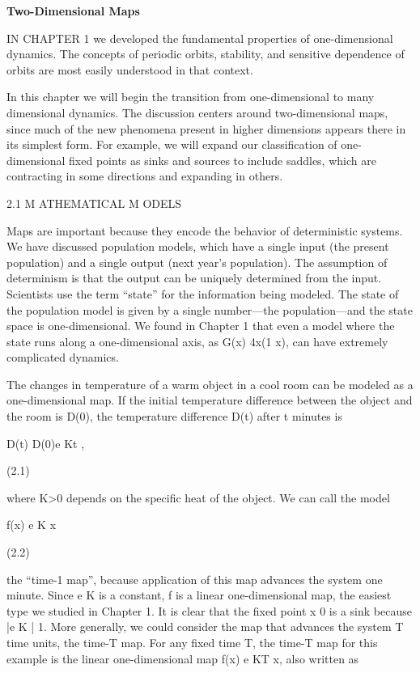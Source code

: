 \documentclass[12pt]{article}
\begin{document}
\textbf{Two-Dimensional Maps }

\hfill

IN CHAPTER 1 we developed the fundamental properties of one-dimensional dynamics. The concepts of periodic orbits, stability, and 
sensitive dependence of orbits are most easily understood in that context.

In this chapter we will begin the transition from one-dimensional to many dimensional dynamics. The discussion centers around 
two-dimensional maps, since much of the new phenomena present in higher dimensions appears there in its simplest form. For example, 
we will expand our classiﬁcation of one-dimensional ﬁxed points as sinks and sources to include saddles, which are contracting in 
some directions and expanding in others.


2.1 M ATHEMATICAL M ODELS

Maps are important because they encode the behavior of deterministic systems. We have discussed population models, which have a 
single input (the present population) and a single output (next year’s population). The assumption of determinism is that the output 
can be uniquely determined from the input. Scientists use the term “state” for the information being modeled. The state of the 
population model is given by a single number—the population—and the state space is one-dimensional. We found in Chapter 1 that even a 
model where the state runs along a one-dimensional axis, as G(x)  4x(1  x), can have extremely complicated dynamics.

The changes in temperature of a warm object in a cool room can be modeled as a one-dimensional map. If the initial temperature 
difference between the object and the room is D(0), the temperature difference D(t) after t minutes is

D(t)  D(0)e Kt ,  

(2.1)

where K>0 depends on the speciﬁc heat of the object. We can call the model

f(x)  e K x

(2.2)

the “time-1 map”, because application of this map advances the system one minute. Since e K is a constant, f is a linear 
one-dimensional map, the easiest type we studied in Chapter 1. It is clear that the ﬁxed point x  0 is a sink because |e K |  1. 
More generally, we could consider the map that advances the system T time units, the time-T map. For any ﬁxed time T, the time-T map 
for this example is the linear one-dimensional map f(x)  e KT x, also written as
\end{document}
